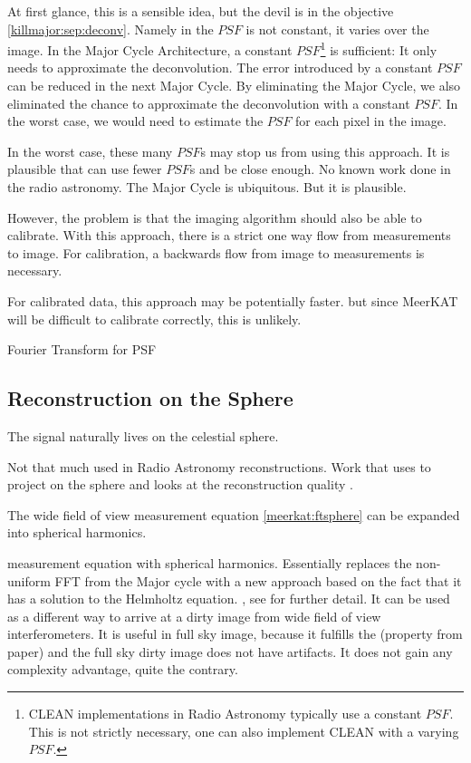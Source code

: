 At first glance, this is a sensible idea, but the devil is in the objective \eqref{killmajor:sep:deconv}. Namely in the $PSF$ is not constant, it varies over the image. In the Major Cycle Architecture, a constant $PSF$\footnote{CLEAN implementations in Radio Astronomy typically use a constant $PSF$. This is not strictly necessary, one can also implement CLEAN with a varying $PSF$.} is sufficient: It only needs to approximate the deconvolution. The error introduced by a constant $PSF$ can be reduced in the next Major Cycle. By eliminating the Major Cycle, we also eliminated the chance to approximate the deconvolution with a constant $PSF$. In the worst case, we would need to estimate the $PSF$ for each pixel in the image.

In the worst case, these many $PSF$s may stop us from using this approach. It is plausible that can use fewer $PSF$s and be close enough. No known work done in the radio astronomy. The Major Cycle is ubiquitous. But it is plausible.

However, the problem is that the imaging algorithm should also be able to calibrate. With this approach, there is a strict one way flow from measurements to image. For calibration, a backwards flow from image to measurements is necessary.

For calibrated data, this approach may be potentially faster. but since MeerKAT will be difficult to calibrate correctly, this is unlikely.

Fourier Transform for PSF

\subsection{Reconstruction on the Sphere}
The signal naturally lives on the celestial sphere.

Not that much used in Radio Astronomy reconstructions. Work that uses to project on the sphere and looks at the reconstruction quality \cite{mcewen2011compressed}.

The wide field of view measurement equation \eqref{meerkat:ftsphere} can be expanded into spherical harmonics.

\cite{carozzi2015imaging} measurement equation with spherical harmonics. Essentially replaces the non-uniform FFT from the Major cycle with a new approach based on the fact that it has a solution to the Helmholtz equation.
, see \cite{carozzi2015imaging} for further detail. It can be used as a different way to arrive at a dirty image from wide field of view interferometers. It is useful in full sky image, because it fulfills the (property from paper) and the full sky dirty image does not have artifacts. It does not gain any complexity advantage, quite the contrary.

